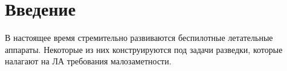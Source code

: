 \chapter*{Введение}

В настоящее время стремительно развиваются беспилотные летательные аппараты. Некоторые из них конструируются под задачи разведки, которые налагают на ЛА требования малозаметности. 
\cite{AvWeekUAV}